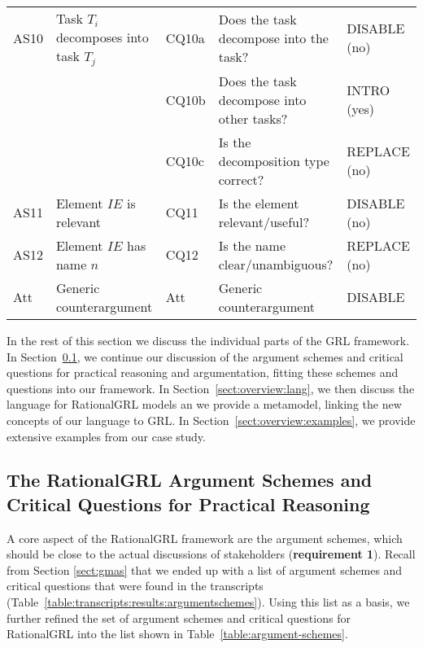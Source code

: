 \begin{table*}[t]
\begin{tabularx}{\textwidth}{|l|l|l|X|l|}
\hline
AS10 & Task $T_i$ decomposes into task $T_j$ & CQ10a & Does the task decompose into the task? & \textsf{DISABLE} (no)\\
 &  & CQ10b & Does the task decompose into other tasks?& \textsf{INTRO} (yes)\\
 &  & CQ10c & Is the decomposition type correct? & \textsf{REPLACE} (no)\\
\hline
AS11 & Element $IE$ is relevant & CQ11 & Is the element relevant/useful? & \textsf{DISABLE} (no)\\
\hline
AS12 & Element $IE$ has name $n$ & CQ12 & Is the name clear/unambiguous? & \textsf{REPLACE} (no)\\
\hline
\hline
Att & Generic counterargument & Att & Generic counterargument & \textsf{DISABLE}\\
\hline
\end{tabularx}
\caption{List of argument schemes (AS0-AS13), critical questions (CQ0-CQ12), and the effect of answering them (right column).}
\label{table:argument-schemes}
\end{table*}

In the rest of this section we discuss the individual parts of the GRL framework. In Section~\ref{sect:overview:as}, we continue our discussion of the argument schemes and critical questions for practical reasoning and argumentation, fitting these schemes and questions into our framework. In Section~\ref{sect:overview:lang}, we then discuss the language for RationalGRL models an we provide a metamodel, linking the new concepts of our language to GRL. In Section~\ref{sect:overview:examples}, we provide extensive examples from our case study.  

\subsection{The RationalGRL Argument Schemes and Critical Questions for Practical Reasoning}
\label{sect:overview:as}

A core aspect of the RationalGRL framework are the argument schemes, which should be close to the actual discussions of stakeholders (\textbf{requirement 1}). Recall from Section \ref{sect:gmas} that we ended up with a list of argument schemes and critical questions that were found in the transcripts (Table~\ref{table:transcripts:results:argumentschemes}). Using this list as a basis, we further refined the set of argument schemes and critical questions for RationalGRL into the list shown in Table~\ref{table:argument-schemes}. 

